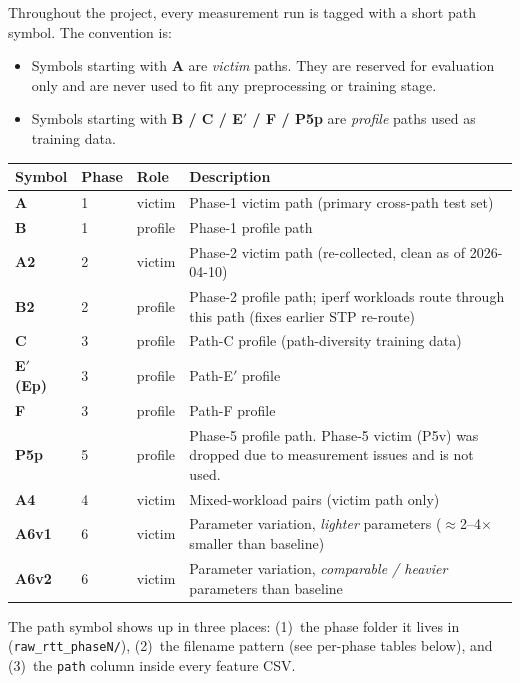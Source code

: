 \documentclass[11pt,a4paper]{article}
\begin{document}
Throughout the project, every measurement run is tagged with a short path
symbol. The convention is:
\begin{itemize}[leftmargin=*]
  \item Symbols starting with \textbf{A} are \emph{victim} paths. They are
        reserved for evaluation only and are never used to fit any
        preprocessing or training stage.
  \item Symbols starting with \textbf{B / C / E$'$ / F / P5p} are
        \emph{profile} paths used as training data.
\end{itemize}

\begin{longtable}{@{}lllp{8cm}@{}}
\toprule
\textbf{Symbol} & \textbf{Phase} & \textbf{Role} & \textbf{Description} \\
\midrule
\endhead
\textbf{A}    & 1 & victim  & Phase-1 victim path (primary cross-path test set) \\
\textbf{B}    & 1 & profile & Phase-1 profile path \\
\textbf{A2}   & 2 & victim  & Phase-2 victim path (re-collected, clean as of 2026-04-10) \\
\textbf{B2}   & 2 & profile & Phase-2 profile path; iperf workloads route through this path (fixes earlier STP re-route) \\
\textbf{C}    & 3 & profile & Path-C profile (path-diversity training data) \\
\textbf{E$'$ (Ep)} & 3 & profile & Path-E$'$ profile \\
\textbf{F}    & 3 & profile & Path-F profile \\
\textbf{P5p}  & 5 & profile & Phase-5 profile path. Phase-5 victim (P5v) was dropped due to measurement issues and is not used. \\
\textbf{A4}   & 4 & victim  & Mixed-workload pairs (victim path only) \\
\textbf{A6v1} & 6 & victim  & Parameter variation, \emph{lighter} parameters ($\approx$2--4$\times$ smaller than baseline) \\
\textbf{A6v2} & 6 & victim  & Parameter variation, \emph{comparable / heavier} parameters than baseline \\
\bottomrule
\end{longtable}

The path symbol shows up in three places: (1)~the phase folder it lives in
(\texttt{raw\_rtt\_phaseN/}), (2)~the filename pattern (see per-phase tables
below), and (3)~the \texttt{path} column inside every feature CSV.
\end{document}
